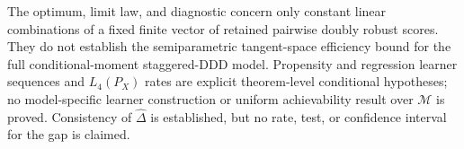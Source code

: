 The optimum, limit law, and diagnostic concern only constant linear combinations of a fixed finite vector of retained pairwise doubly robust scores. They do not establish the semiparametric tangent-space efficiency bound for the full conditional-moment staggered-DDD model. Propensity and regression learner sequences and \(L_4(P_X)\) rates are explicit theorem-level conditional hypotheses; no model-specific learner construction or uniform achievability result over \(\mathcal M\) is proved. Consistency of \(\widehat\Delta\) is established, but no rate, test, or confidence interval for the gap is claimed.